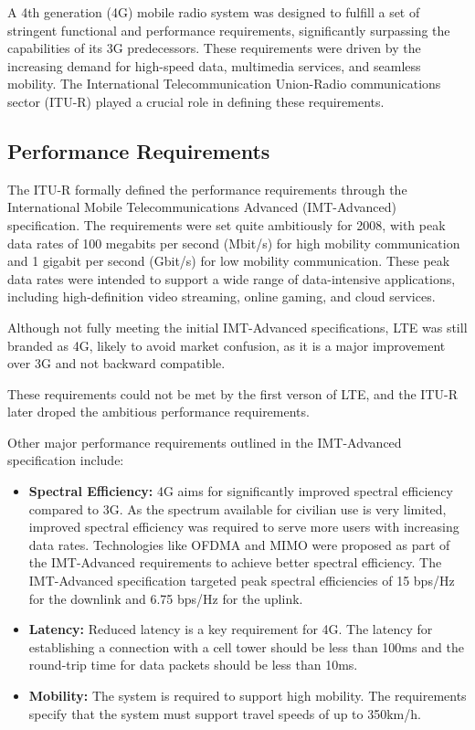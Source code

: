 A 4th generation (4G) mobile radio system was designed to fulfill a set of stringent functional and performance requirements, significantly surpassing the capabilities of its 3G predecessors. These requirements were driven by the increasing demand for high-speed data, multimedia services, and seamless mobility. The International Telecommunication Union-Radio communications sector (ITU-R) played a crucial role in defining these requirements.

\subsection{Performance Requirements}

The ITU-R formally defined the performance requirements through the International Mobile Telecommunications Advanced (IMT-Advanced) specification. The requirements were set quite ambitiously for 2008, with peak data rates of 100 megabits per second (Mbit/s) for high mobility communication and 1 gigabit per second (Gbit/s) for low mobility communication. These peak data rates were intended to support a wide range of data-intensive applications, including high-definition video streaming, online gaming, and cloud services.

Although not fully meeting the initial IMT-Advanced specifications, LTE was still branded as 4G, likely to avoid market confusion, as it is a major improvement over 3G and not backward compatible. 

These requirements could not be met by the first verson of LTE, and the ITU-R later droped the ambitious performance requirements. 

Other major performance requirements outlined in the IMT-Advanced specification include:

\begin{itemize}
    \item \textbf{Spectral Efficiency:} 4G aims for significantly improved spectral efficiency compared to 3G. As the spectrum available for civilian use is very limited, improved spectral efficiency was required to serve more users with increasing data rates. Technologies like OFDMA and MIMO were proposed as part of the IMT-Advanced requirements to achieve better spectral efficiency. The IMT-Advanced specification targeted peak spectral efficiencies of 15 bps/Hz for the downlink and 6.75 bps/Hz for the uplink.
    \item \textbf{Latency:} Reduced latency is a key requirement for 4G. The latency for establishing a connection with a cell tower should be less than 100ms and the round-trip time for data packets should be less than 10ms.
    \item \textbf{Mobility:} The system is required to support high mobility. The requirements specify that the system must support travel speeds of up to 350km/h.
\end{itemize}

